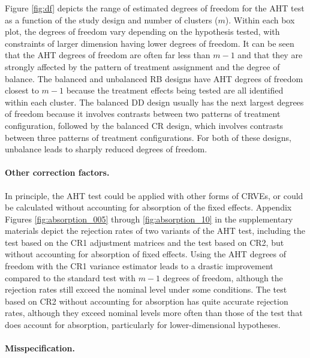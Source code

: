 \documentclass[12pt]{article}
\begin{document}
Figure \ref{fig:df} depicts the range of estimated degrees of freedom
for the AHT test as a function of the study design and number of
clusters (\(m\)). Within each box plot, the degrees of freedom vary
depending on the hypothesis tested, with constraints of larger dimension
having lower degrees of freedom. It can be seen that the AHT degrees of
freedom are often far less than \(m - 1\) and that they are strongly
affected by the pattern of treatment assignment and the degree of
balance. The balanced and unbalanced RB designs have AHT degrees of
freedom closest to \(m - 1\) because the treatment effects being tested
are all identified within each cluster. The balanced DD design usually
has the next largest degrees of freedom because it involves contrasts
between two patterns of treatment configuration, followed by the
balanced CR design, which involves contrasts between three patterns of
treatment configurations. For both of these designs, unbalance leads to
sharply reduced degrees of freedom.

\hypertarget{other-correction-factors.}{%
\paragraph{Other correction factors.}\label{other-correction-factors.}}

In principle, the AHT test could be applied with other forms of CRVEs,
or could be calculated without accounting for absorption of the fixed
effects. Appendix Figures \ref{fig:absorption_005} through
\ref{fig:absorption_10} in the supplementary materials depict the
rejection rates of two variants of the AHT test, including the test
based on the CR1 adjustment matrices and the test based on CR2, but
without accounting for absorption of fixed effects. Using the AHT
degrees of freedom with the CR1 variance estimator leads to a drastic
improvement compared to the standard test with \(m - 1\) degrees of
freedom, although the rejection rates still exceed the nominal level
under some conditions. The test based on CR2 without accounting for
absorption has quite accurate rejection rates, although they exceed
nominal levels more often than those of the test that does account for
absorption, particularly for lower-dimensional hypotheses.

\hypertarget{misspecification.}{%
\paragraph{Misspecification.}\label{misspecification.}}
\end{document}
